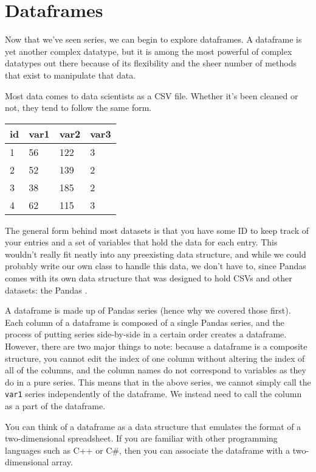 \section{Dataframes}
Now that we've seen series, we can begin to explore dataframes. A dataframe is yet another complex datatype, but it is among the most powerful of complex datatypes out there because of its flexibility and the sheer number of methods that exist to manipulate that data.\par
Most data comes to data scientists as a CSV file. Whether it's been cleaned or not, they tend to follow the same form.\par
\vspace{5mm}
\begin{tabular}{|l|l|l|l|}
\hline
id & var1 & var2 & var3 \\
\hline
1  & 56   & 122  & 3    \\
\hline
2  & 52   & 139  & 2    \\
\hline
3  & 38   & 185  & 2    \\
\hline
4  & 62   & 115  & 3    \\
\hline
\end{tabular}\par
\vspace{5mm}
The general form behind most datasets is that you have some ID to keep track of your entries and a set of variables that hold the data for each entry. This wouldn't really fit neatly into any preexisting data structure, and while we could probably write our own class to handle this data, we don't have to, since Pandas comes with its own data structure that was designed to hold CSVs and other datasets: the Pandas .\par
A dataframe is made up of Pandas series (hence why we covered those first). Each column of a dataframe is composed of a single Pandas series, and the process of putting series side-by-side in a certain order creates a dataframe. However, there are two major things to note: because a dataframe is a composite structure, you cannot edit the index of one column without altering the index of all of the columns, and the column names do not correspond to variables as they do in a pure series. This means that in the above series, we cannot simply call the \verb|var1| series independently of the dataframe. We instead need to call the column as a part of the dataframe.\par
You can think of a dataframe as a data structure that emulates the format of a two-dimensional spreadsheet. If you are familiar with other programming languages such as C++ or C\#, then you can associate the dataframe with a two-dimensional array.\par
